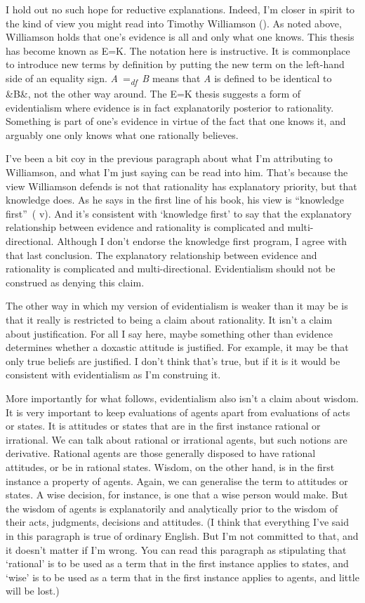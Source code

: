 \documentclass[
  10pt,
  letterpaper,
  DIV=11,
  numbers=noendperiod,
  twoside]{scrartcl}
\begin{document}
I hold out no such hope for reductive explanations. Indeed, I'm closer
in spirit to the kind of view you might read into Timothy Williamson
(). As noted above, Williamson holds
that one's evidence is all and only what one knows. This thesis has
become known as E=K. The notation here is instructive. It is commonplace
to introduce new terms by definition by putting the new term on the
left-hand side of an equality sign.
\emph{A}~=\textsubscript{\emph{df}}~\emph{B} means that \emph{A} is
defined to be identical to \&B\&, not the other way around. The E=K
thesis suggests a form of evidentialism where evidence is in fact
explanatorily posterior to rationality. Something is part of one's
evidence in virtue of the fact that one knows it, and arguably one only
knows what one rationally believes.

I've been a bit coy in the previous paragraph about what I'm attributing
to Williamson, and what I'm just saying can be read into him. That's
because the view Williamson defends is not that rationality has
explanatory priority, but that knowledge does. As he says in the first
line of his book, his view is ``knowledge
first''~( v). And it's
consistent with `knowledge first' to say that the explanatory
relationship between evidence and rationality is complicated and
multi-directional. Although I don't endorse the knowledge first program,
I agree with that last conclusion. The explanatory relationship between
evidence and rationality is complicated and multi-directional.
Evidentialism should not be construed as denying this claim.

The other way in which my version of evidentialism is weaker than it may
be is that it really is restricted to being a claim about rationality.
It isn't a claim about justification. For all I say here, maybe
something other than evidence determines whether a doxastic attitude is
justified. For example, it may be that only true beliefs are justified.
I don't think that's true, but if it is it would be consistent with
evidentialism as I'm construing it.

More importantly for what follows, evidentialism also isn't a claim
about wisdom. It is very important to keep evaluations of agents apart
from evaluations of acts or states. It is attitudes or states that are
in the first instance rational or irrational. We can talk about rational
or irrational agents, but such notions are derivative. Rational agents
are those generally disposed to have rational attitudes, or be in
rational states. Wisdom, on the other hand, is in the first instance a
property of agents. Again, we can generalise the term to attitudes or
states. A wise decision, for instance, is one that a wise person would
make. But the wisdom of agents is explanatorily and analytically prior
to the wisdom of their acts, judgments, decisions and attitudes. (I
think that everything I've said in this paragraph is true of ordinary
English. But I'm not committed to that, and it doesn't matter if I'm
wrong. You can read this paragraph as stipulating that `rational' is to
be used as a term that in the first instance applies to states, and
`wise' is to be used as a term that in the first instance applies to
agents, and little will be lost.)
\end{document}
